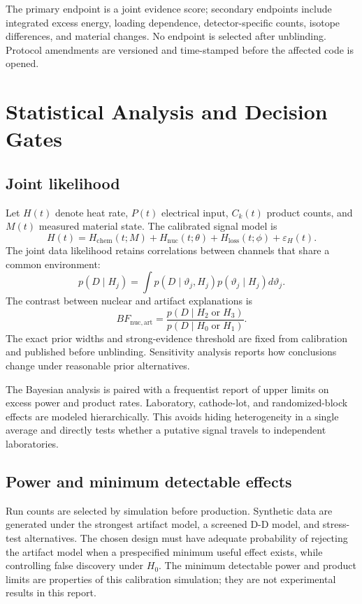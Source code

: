 \documentclass[conference]{IEEEtran}
\begin{document}
The primary endpoint is a joint evidence score; secondary endpoints include integrated excess energy, loading dependence, detector-specific counts, isotope differences, and material changes. No endpoint is selected after unblinding. Protocol amendments are versioned and time-stamped before the affected code is opened.

\section{Statistical Analysis and Decision Gates}
\label{sec:stats}
\subsection{Joint likelihood}
Let $H(t)$ denote heat rate, $P(t)$ electrical input, $C_k(t)$ product counts, and $M(t)$ measured material state. The calibrated signal model is
\begin{equation}
H(t)=H_{\mathrm{chem}}(t;M)+H_{\mathrm{nuc}}(t;\theta)+H_{\mathrm{loss}}(t;\phi)+\varepsilon_H(t).
\label{eq:heatmodel}
\end{equation}
The joint data likelihood retains correlations between channels that share a common environment:
\begin{equation}
p(D\mid H_j)=\int p(D\mid\vartheta_j,H_j)p(\vartheta_j\mid H_j)d\vartheta_j.
\label{eq:marginal}
\end{equation}
The contrast between nuclear and artifact explanations is
\begin{equation}
BF_{\mathrm{nuc,art}}=\frac{p(D\mid H_2\;\mathrm{or}\;H_3)}{p(D\mid H_0\;\mathrm{or}\;H_1)}.
\label{eq:bf}
\end{equation}
The exact prior widths and strong-evidence threshold are fixed from calibration and published before unblinding. Sensitivity analysis reports how conclusions change under reasonable prior alternatives.

The Bayesian analysis is paired with a frequentist report of upper limits on excess power and product rates. Laboratory, cathode-lot, and randomized-block effects are modeled hierarchically. This avoids hiding heterogeneity in a single average and directly tests whether a putative signal travels to independent laboratories.

\subsection{Power and minimum detectable effects}
Run counts are selected by simulation before production. Synthetic data are generated under the strongest artifact model, a screened D-D model, and stress-test alternatives. The chosen design must have adequate probability of rejecting the artifact model when a prespecified minimum useful effect exists, while controlling false discovery under $H_0$. The minimum detectable power and product limits are properties of this calibration simulation; they are not experimental results in this report.
\end{document}
